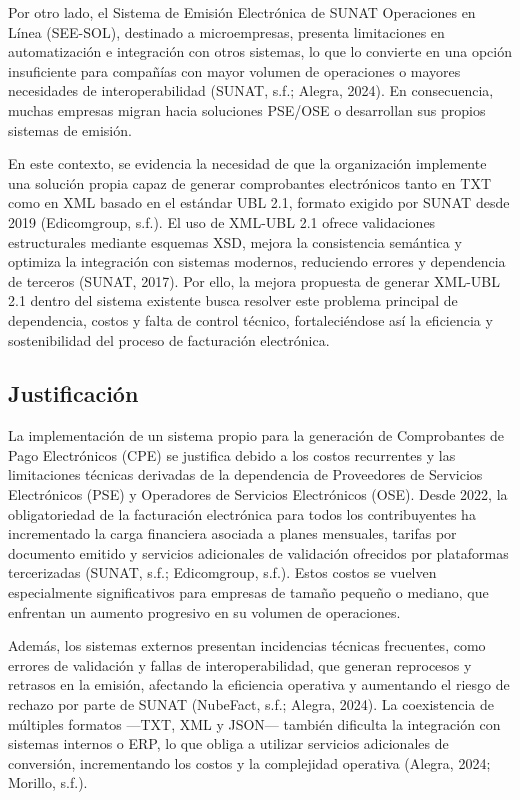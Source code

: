 \documentclass[12pt, a4paper]{article}
\begin{document}
Por otro lado, el Sistema de Emisión Electrónica de SUNAT Operaciones en Línea (SEE-SOL), destinado a microempresas, presenta limitaciones en automatización e integración con otros sistemas, lo que lo convierte en una opción insuficiente para compañías con mayor volumen de operaciones o mayores necesidades de interoperabilidad (SUNAT, s.f.; Alegra, 2024). En consecuencia, muchas empresas migran hacia soluciones PSE/OSE o desarrollan sus propios sistemas de emisión.

En este contexto, se evidencia la necesidad de que la organización implemente una solución propia capaz de generar comprobantes electrónicos tanto en TXT como en XML basado en el estándar UBL 2.1, formato exigido por SUNAT desde 2019 (Edicomgroup, s.f.). El uso de XML-UBL 2.1 ofrece validaciones estructurales mediante esquemas XSD, mejora la consistencia semántica y optimiza la integración con sistemas modernos, reduciendo errores y dependencia de terceros (SUNAT, 2017). Por ello, la mejora propuesta de generar XML-UBL 2.1 dentro del sistema existente busca resolver este problema principal de dependencia, costos y falta de control técnico, fortaleciéndose así la eficiencia y sostenibilidad del proceso de facturación electrónica.

\subsection{Justificación}

La implementación de un sistema propio para la generación de Comprobantes de Pago Electrónicos (CPE) se justifica debido a los costos recurrentes y las limitaciones técnicas derivadas de la dependencia de Proveedores de Servicios Electrónicos (PSE) y Operadores de Servicios Electrónicos (OSE). Desde 2022, la obligatoriedad de la facturación electrónica para todos los contribuyentes ha incrementado la carga financiera asociada a planes mensuales, tarifas por documento emitido y servicios adicionales de validación ofrecidos por plataformas tercerizadas (SUNAT, s.f.; Edicomgroup, s.f.). Estos costos se vuelven especialmente significativos para empresas de tamaño pequeño o mediano, que enfrentan un aumento progresivo en su volumen de operaciones.

Además, los sistemas externos presentan incidencias técnicas frecuentes, como errores de validación y fallas de interoperabilidad, que generan reprocesos y retrasos en la emisión, afectando la eficiencia operativa y aumentando el riesgo de rechazo por parte de SUNAT (NubeFact, s.f.; Alegra, 2024). La coexistencia de múltiples formatos —TXT, XML y JSON— también dificulta la integración con sistemas internos o ERP, lo que obliga a utilizar servicios adicionales de conversión, incrementando los costos y la complejidad operativa (Alegra, 2024; Morillo, s.f.).
\end{document}
